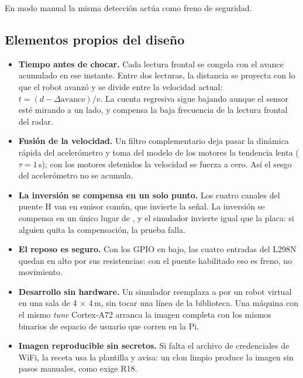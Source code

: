 \documentclass[11pt,a4paper]{article}
\newcommand{\id}[1]{\texttt{\detokenize{#1}}}
\begin{document}
En modo manual la misma detección actúa como freno de seguridad.

\subsection{Elementos propios del diseño}
\label{sec:creativo}

\begin{itemize}
  \item \textbf{Tiempo antes de chocar.} Cada lectura frontal se congela con
        el avance acumulado en ese instante. Entre dos lecturas, la distancia
        se proyecta con lo que el robot avanzó y se divide entre la velocidad
        actual: $t = (d - \Delta\text{avance}) / v$. La cuenta regresiva
        sigue bajando aunque el sensor esté mirando a un lado, y compensa la
        baja frecuencia de la lectura frontal del radar.
  \item \textbf{Fusión de la velocidad.} Un filtro complementario deja pasar
        la dinámica rápida del acelerómetro y toma del modelo de los motores
        la tendencia lenta ($\tau = 1$\,s); con los motores detenidos la
        velocidad se fuerza a cero. Así el sesgo del acelerómetro no se
        acumula.
  \item \textbf{La inversión se compensa en un solo punto.} Los cuatro
        canales del puente H van en emisor común, que invierte la señal. La
        inversión se compensa en un único lugar de \id{lib_motors.c}, y el
        simulador invierte igual que la placa: si alguien quita la
        compensación, la prueba falla.
  \item \textbf{El reposo es seguro.} Con los GPIO en bajo, las cuatro
        entradas del L298N quedan en alto por sus resistencias: con el puente
        habilitado eso es freno, no movimiento.
  \item \textbf{Desarrollo sin hardware.} Un simulador reemplaza a
        \id{pigpiod} por un robot virtual en una sala de 4 $\times$ 4\,m, sin
        tocar una línea de la biblioteca. Una máquina \id{qemuarm64-robot}
        con el mismo \emph{tune} Cortex-A72 arranca la imagen completa con
        los mismos binarios de espacio de usuario que corren en la Pi.
  \item \textbf{Imagen reproducible sin secretos.} Si falta el archivo de
        credenciales de WiFi, la receta usa la plantilla y avisa: un clon
        limpio produce la imagen sin pasos manuales, como exige R18.
\end{itemize}
\end{document}
